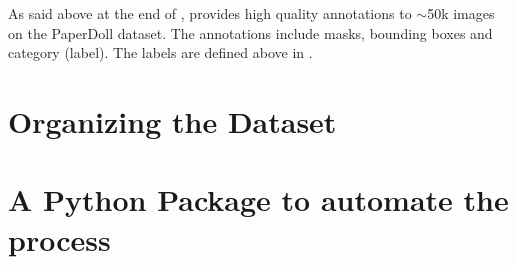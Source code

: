 As said above at the end of , \modanet provides high quality annotations to $\sim$50k images on the PaperDoll dataset. The annotations include masks, bounding boxes and category (label). The labels are defined above in .

\section{Organizing the Dataset}\label{s:ds-organizing}

\section{A Python Package to automate the process}\label{s:ds-package}